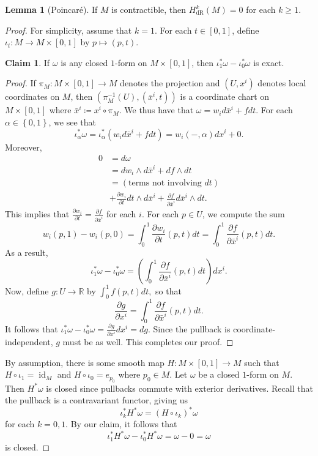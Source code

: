 \documentclass[10pt,letterpaper,cm]{nupset}
\theoremstyle{definition}
\theoremstyle{theorem}
\newtheorem{lemma}[definition]{Lemma}
\newtheorem*{claim}{Claim}
\theoremstyle{remark}
\newcommand{\R}{\mathbb R}
\newcommand{\1}{\mathbf{1}}
\newcommand{\0}{\vec 0}
\DeclareMathOperator{\id}{id}
\DeclareMathOperator{\dr}{dR}
\begin{document}
\begin{lemma}[Poincar\'e]
If $M$ is  contractible, then $H_{\dr}^k(M) = 0$ for each $k\geq 1$.
\end{lemma}
\begin{proof}
For simplicity, assume that $k=1$. For each $t\in \left[0,1\right]$, define $\iota_t : M \to M \times \left[0,1\right]$ by $p\mapsto (p, t)$.
\begin{claim} If $\omega$ is any closed $1$-form  on $M\times \left[0,1\right]$, then $\iota^{\ast}_1\omega -\iota^{\ast}_0\omega$ is exact. \end{claim}
\begin{proof} If $\pi_M : M \times \left[0,1\right] \to M$ denotes the projection and $\left(U, x^i\right)$ denotes local coordinates on $M$, then $\left(\pi_M^{-1}(U), (\bar{x}^i, t)\right)$ is a coordinate chart on $M \times \left[0,1\right]$ where $\bar{x}^i \coloneqq  x^i \circ \pi_M$. We thus have that $\omega = w_id\bar{x}^i+ f dt$. For each $\alpha \in \left\{0,1\right\}$, we see that $$ \iota^{\ast}_{\alpha}\omega = \iota^{\ast}_{\alpha}(w_id\bar{x}^i +fdt)=w_i({-}, \alpha)dx^i +0  .$$ Moreover, 
\begin{align*}  0 & =d\omega
\\ &  =dw_i \wedge d\bar{x}^i +df \wedge dt \\ & = \left(\text{terms not involving }dt\right) \\ & +\frac{\partial{w_i}}{\partial{t}}dt \wedge d\bar{x}^i 
+\frac{\partial{f}}{\partial{\bar{x}^i}}d\bar{x}^i\wedge dt  . \end{align*}
This implies that $\frac{\partial{w_i}}{\partial{t}} = \frac{\partial{f}}{\partial{\bar{x}^i}}$ for each $i$. For each $p\in U$, we compute the sum 
$$ w_i(p, 1) -w_i(p,0) = \int_0^1  \frac{\partial{w_i}}{\partial{t}}(p, t)dt =  \int_0^1 \frac{\partial{f}}{\partial{\bar{x}^i}}(p,t)dt .$$ As a result, $$\iota^{\ast}_1 \omega -\iota^{\ast}_0 \omega =  \left( \int_0^1 \frac{\partial{f}}{\partial{\bar{x}^i}}(p,t)dt \right)dx^i .$$ Now, define $g: U \to \R$ by $\int_0^1f(p,t)dt,$ so that $$\frac{\partial{g}}{\partial{x^i}} = \int_0^1\frac{\partial{f}}{\partial{\bar{x}^i}}(p,t)dt.$$ It follows that $\iota^{\ast}_1 \omega -\iota^{\ast}_0 \omega  = \frac{\partial{g}}{\partial{x^i}}dx^i = dg.$
 Since the pullback is coordinate-independent, $g$ must be as well. This completes our proof.
\end{proof}
By assumption, there is some smooth map $H: M \times \left[0,1\right] \to M$ such that $H \circ \iota_1 =\id_M$ and $H \circ \iota_0 = e_{p_0}$ where $p_0 \in M$. Let $\omega$ be a closed $1$-form  on $M$. Then $H^{\ast} \omega$ is closed since pullbacks commute with exterior derivatives. Recall that the pullback is a contravariant functor, giving us
\[
 \iota^{\ast}_k H^{\ast}\omega = \left(H \circ \iota_k\right)^{\ast}\omega
\] for each $k=0,1$. By our claim, it follows that $$\iota^{\ast}_1H^{\ast}\omega - \iota^{\ast}_0 H^{\ast}\omega = \omega -0 = \omega$$ is closed.
\end{proof}
\end{document}
